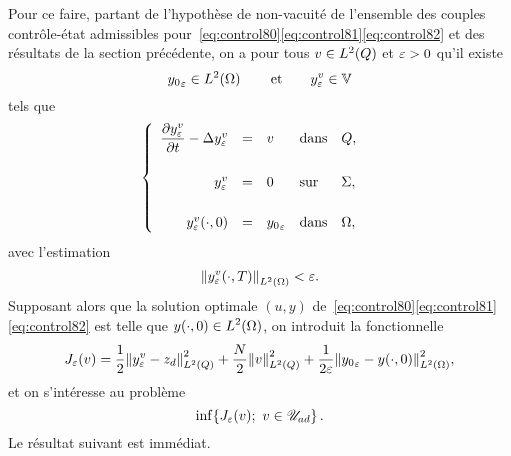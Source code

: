Pour ce faire, partant de l'hypothèse de non-vacuité de l'ensemble des
couples contrôle-état admissibles
pour~\eqref{eq:control80}\eqref{eq:control81}\eqref{eq:control82} et des
résultats de la section précédente, on a pour tous $v\in L^{2}\!\left({Q}\right)$ et
$\varepsilon > 0$ qu'il existe
\begin{equation*}
    {y_{0}}_{\varepsilon}\in L^{2}\!\left({\Omega}\right)\qquad\text{et}\qquad y_{\varepsilon}^{v}\in
    \mathbb{V}
\end{equation*}
tels que
\begin{equation*}
    \begin{cases}\displaystyle
        \begin{array}{rclll}
            \dfrac{\partial{}y_{\varepsilon}^{v}}{\partial{}t} - \Delta y_{\varepsilon}^{v} & = & v &
            \text{dans} & Q,\\
            \\
            y_{\varepsilon}^{v} & = & 0 & \text{sur} & \Sigma,\\
            \\
            {y_{\varepsilon}^{v}}\!\left({\cdot, 0}\right) & = & {y_{0}}_{\varepsilon} &
            \text{dans} & \Omega,
        \end{array}
    \end{cases}
\end{equation*}
avec l'estimation
\begin{equation*}
    \normeohm{%
        \condfinale{y_{\veps}^{v}}
    } < \veps.
\end{equation*}
Supposant alors que la solution optimale $(u,y)$
de~\eqref{eq:control80}\eqref{eq:control81}\eqref{eq:control82} est telle
que $\displaystyle {y}\!\left({\cdot, 0}\right)\in L^{2}\!\left({\Omega}\right)$, on introduit la
fonctionnelle
\begin{equation*}
    J_{\varepsilon}(v) = \dfrac{1}{2}{\left\|{y_{\varepsilon}^{v} - z_{d} }\right\|}_{L^{2}\left({Q}\right)}^{2} +
    \dfrac{N}{2}{\left\|{v }\right\|}_{L^{2}\left({Q}\right)}^{2} + \dfrac{1}{2\varepsilon}{\left\|{{y_{0}}_{\varepsilon} -
    {y}\!\left({\cdot, 0}\right) }\right\|}_{L^{2}\left({\Omega}\right)}^{2},
\end{equation*}
et on s'intéresse au problème
\begin{equation}\label{eq:control87}
    \inf\!\left\{{%
        J_{\veps}(v);\ v\in\uad
    }\right\}.
\end{equation}
Le résultat suivant est immédiat.

